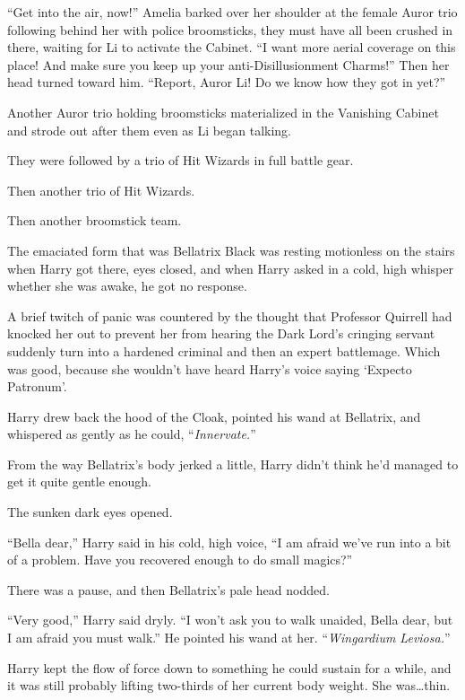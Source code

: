 “Get into the air, now!” Amelia barked over her shoulder at the female Auror trio following behind her with police broomsticks, they must have all been crushed in there, waiting for Li to activate the Cabinet. “I want more aerial coverage on this place! And make sure you keep up your anti-Disillusionment Charms!” Then her head turned toward him. “Report, Auror Li! Do we know how they got in yet?”

Another Auror trio holding broomsticks materialized in the Vanishing Cabinet and strode out after them even as Li began talking.

They were followed by a trio of Hit Wizards in full battle gear.

Then another trio of Hit Wizards.

Then another broomstick team.

\later

The emaciated form that was Bellatrix Black was resting motionless on the stairs when Harry got there, eyes closed, and when Harry asked in a cold, high whisper whether she was awake, he got no response.

A brief twitch of panic was countered by the thought that Professor Quirrell had knocked her out to prevent her from hearing the Dark Lord’s cringing servant suddenly turn into a hardened criminal and then an expert battlemage. Which was good, because she wouldn’t have heard Harry’s voice saying ‘Expecto Patronum’.

Harry drew back the hood of the Cloak, pointed his wand at Bellatrix, and whispered as gently as he could, “\emph{Innervate.}”

From the way Bellatrix’s body jerked a little, Harry didn’t think he’d managed to get it quite gentle enough.

The sunken dark eyes opened.

“Bella dear,” Harry said in his cold, high voice, “I am afraid we’ve run into a bit of a problem. Have you recovered enough to do small magics?”

There was a pause, and then Bellatrix’s pale head nodded.

“Very good,” Harry said dryly. “I won’t ask you to walk unaided, Bella dear, but I am afraid you must walk.” He pointed his wand at her. “\emph{Wingardium Leviosa.}”

Harry kept the flow of force down to something he could sustain for a while, and it was still probably lifting two-thirds of her current body weight. She was…thin.

